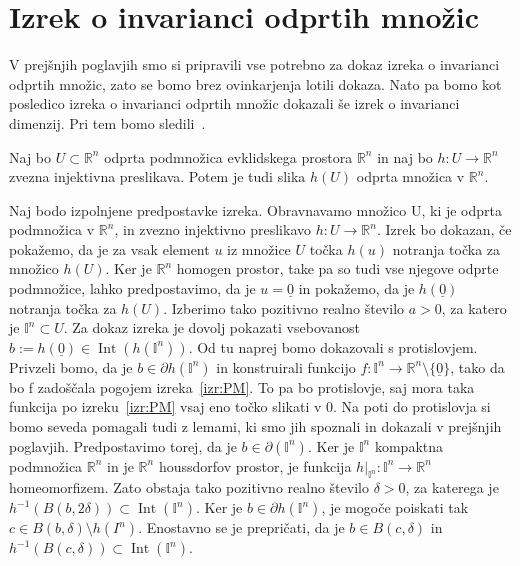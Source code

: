 \documentclass[mat1]{fmfdelo}
\newcommand{\R}{\mathbb R}
\DeclareMathOperator{\Int}{Int}
\newcommand{\I}{\mathbb I}
\newcommand{\0}{\underline{0}}
\begin{document}
\section{Izrek o invarianci odprtih množic}\label{raz:ioiom}
V prejšnjih poglavjih smo si pripravili vse potrebno za dokaz izreka o invarianci odprtih množic, zato se bomo brez ovinkarjenja lotili dokaza. Nato pa bomo kot posledico izreka o invarianci odprtih množic dokazali še izrek o invarianci dimenzij. Pri tem bomo sledili~\cite{Kulpa}.
%
\begin{izrek}\label{izr:main-theorem}
Naj bo $U \subset \R^n$ odprta podmnožica evklidskega prostora $\R^n$ in naj bo $h : U \rightarrow \R^n$ zvezna injektivna preslikava.
Potem je tudi slika $h(U)$ odprta množica v $\R^n$.
\end{izrek}
%
\begin{dokaz}
Naj bodo izpolnjene predpostavke izreka. Obravnavamo množico U, ki je odprta podmnožica v $\R^n$, in zvezno injektivno preslikavo $h : U \rightarrow \R^n$. Izrek bo dokazan, če pokažemo, da je za vsak element $u$ iz množice $U$ točka $h(u)$ notranja točka za množico $h(U)$. Ker je $\R^n$ homogen prostor, take pa so tudi vse njegove odprte podmnožice, lahko predpostavimo, da je $u = \0$ in pokažemo, da je $h(\0)$ notranja točka za $h(U)$. Izberimo tako pozitivno realno število $a > 0$, za katero je $\I^n \subset U$. Za dokaz izreka je dovolj pokazati vsebovanost $b := h(\0) \in \Int(h(\I^n))$. Od tu naprej bomo dokazovali s protislovjem. Privzeli bomo, da je $b \in \partial h(\I^n)$ in konstruirali funkcijo $f : \I^n \to \R^n \setminus \{ \0 \}$, tako da bo f zadoščala pogojem izreka~\ref{izr:PM}. To pa bo protislovje, saj mora taka funkcija po izreku~\ref{izr:PM} vsaj eno točko slikati v $0$. Na poti do protislovja si bomo seveda pomagali tudi z lemami, ki smo jih spoznali in dokazali v prejšnjih poglavjih. Predpostavimo torej, da je $b \in \partial (\I^n)$. Ker je $\I^n$ kompaktna podmnožica $\R^n$ in je $\R^n$ houssdorfov prostor, je funkcija $h|_{\I^n} : \I^n \to \R^n$ homeomorfizem. Zato obstaja tako pozitivno realno število $\delta > 0$, za katerega je $h^{-1}(B(b, 2 \delta)) \subset \Int(\I^n)$. Ker je $b \in \partial h(\I^n)$, je mogoče poiskati tak $c \in B(b, \delta) \setminus h(I^n)$. Enostavno se je prepričati, da je $b \in B(c, \delta)$ in $h^{-1} (B(c, \delta)) \subset \Int (\I^n)$.


\end{dokaz}
\end{document}
